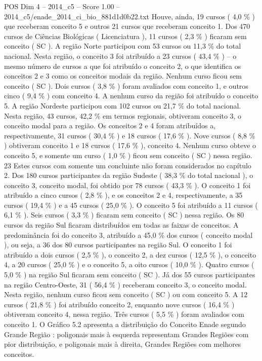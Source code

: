 \begin{textsample}{POS Dim 4 – 2014\_c5 – Score 1.00 – 2014\_c5/enade\_2014\_ci\_bio\_881d1d0b22.txt}
Houve, ainda, 19 cursos ( 4,0 \% ) que receberam conceito 5 e outros 21 cursos que receberam conceito 1.
Dos 470 cursos de Ciências Biológicas ( Licenciatura ), 11 cursos ( 2,3 \% ) ficaram sem conceito ( SC ).
A região Norte participou com 53 cursos ou 11,3 \% do total nacional.
Nesta região, o conceito 3 foi atribuído a 23 cursos ( 43,4 \% ) – o mesmo número de cursos a que foi atribuído o conceito 2, o que identifica os conceitos 2 e 3 como os conceitos modais da região.
Nenhum curso ficou sem conceito ( SC ).
Dois cursos ( 3,8 \% ) foram avaliados com conceito 1, e outros cinco ( 9,4 \% ) com conceito 4.
A nenhum curso da região foi atribuído o conceito 5.
A região Nordeste participou com 102 cursos ou 21,7 \% do total nacional.
Nesta região, 43 cursos, 42,2 \% em termos regionais, obtiveram conceito 3, o conceito modal para a região.
Os conceitos 2 e 4 foram atribuídos a, respectivamente, 31 cursos ( 30,4 \% ) e 18 cursos ( 17,6 \% ).
Nove cursos ( 8,8 \% ) obtiveram conceito 1 e 18 cursos ( 17,6 \% ), conceito 4.
Nenhum curso obteve o conceito 5, e somente um curso ( 1,0 \% ) ficou sem conceito ( SC ) nessa região. 23 Estes cursos com somente um concluinte não foram considerados no capítulo 2.
Dos 180 cursos participantes da região Sudeste ( 38,3 \% do total nacional ), o conceito 3, conceito modal, foi obtido por 78 cursos ( 43,3 \% ).
O conceito 1 foi atribuído a cinco cursos ( 2,8 \% ), e os conceitos 2 e 4, respectivamente, a 35 cursos ( 19,4 \% ) e a 45 cursos ( 25,0 \% ).
O conceito 5 foi atribuído a 11 cursos ( 6,1 \% ).
Seis cursos ( 3,3 \% ) ficaram sem conceito ( SC ) nessa região.
Os 80 cursos da região Sul ficaram distribuídos em todas as faixas de conceitos.
A predominância foi do conceito 3, atribuído a 45,0 \% dos cursos ( conceito modal ), ou seja, a 36 dos 80 cursos participantes na região Sul.
O conceito 1 foi atribuído a dois cursos ( 2,5 \% ), o conceito 2, a dez cursos ( 12,5 \% ), o conceito 4, a 20 cursos ( 25,0 \% ) e o conceito 5, a oito cursos ( 10,0 \% ).
Quatro cursos ( 5,0 \% ) na região Sul ficaram sem conceito ( SC ).
Já dos 55 cursos participantes na região Centro-Oeste, 31 ( 56,4 \% ) receberam conceito 3, o conceito modal.
Nesta região, nenhum curso ficou sem conceito ( SC ) ou com conceito 5.
A 12 cursos ( 21,8 \% ) foi atribuído conceito 2, enquanto nove cursos ( 16,4 \% ) obtiveram conceito 4, nessa região.
Três cursos ( 5,5 \% ) foram avaliados com conceito 1.
O Gráfico 5.2 apresenta a distribuição do Conceito Enade segundo Grande Região : poligonais mais à esquerda representam Grandes Regiões com pior distribuição, e poligonais mais à direita, Grandes Regiões com melhores conceitos.

\end{textsample}
